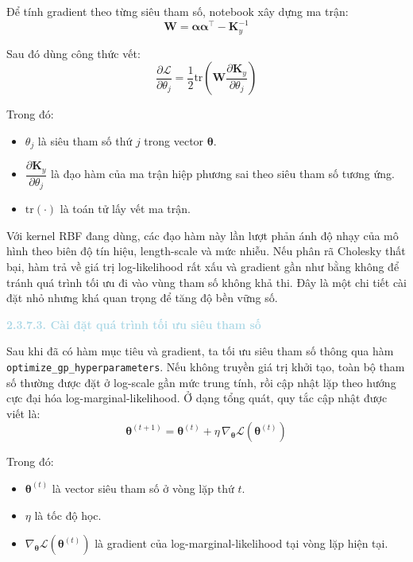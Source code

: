 Để tính gradient theo từng siêu tham số, notebook xây dựng ma trận:
\begin{equation}
    \mathbf{W} = \boldsymbol{\alpha}\boldsymbol{\alpha}^{\top} - \mathbf{K}_y^{-1}
\end{equation}

Sau đó dùng công thức vết:
\begin{equation}
    \frac{\partial \mathcal{L}}{\partial \theta_j} = \frac{1}{2}\mathrm{tr}\!\left(\mathbf{W}\frac{\partial \mathbf{K}_y}{\partial \theta_j}\right)
\end{equation}

Trong đó:
\begin{itemize}
    \item $\theta_j$ là siêu tham số thứ $j$ trong vector $\boldsymbol{\theta}$.
    \item $\dfrac{\partial \mathbf{K}_y}{\partial \theta_j}$ là đạo hàm của ma trận hiệp phương sai theo siêu tham số tương ứng.
    \item $\mathrm{tr}(\cdot)$ là toán tử lấy vết ma trận.
\end{itemize}

Với kernel RBF đang dùng, các đạo hàm này lần lượt phản ánh độ nhạy của mô hình theo biên độ tín hiệu, length-scale và mức nhiễu. Nếu phân rã Cholesky thất bại, hàm trả về giá trị log-likelihood rất xấu và gradient gần như bằng không để tránh quá trình tối ưu đi vào vùng tham số không khả thi. Đây là một chi tiết cài đặt nhỏ nhưng khá quan trọng để tăng độ bền vững số.

\noindent\textcolor{lightblue}{\textbf{2.3.7.3. Cài đặt quá trình tối ưu siêu tham số}}

Sau khi đã có hàm mục tiêu và gradient, ta tối ưu siêu tham số thông qua hàm \texttt{optimize\_gp\_hyperparameters}. Nếu không truyền giá trị khởi tạo, toàn bộ tham số thường được đặt ở log-scale gần mức trung tính, rồi cập nhật lặp theo hướng cực đại hóa log-marginal-likelihood. Ở dạng tổng quát, quy tắc cập nhật được viết là:
\begin{equation}
    \boldsymbol{\theta}^{(t+1)} = \boldsymbol{\theta}^{(t)} + \eta\, \nabla_{\boldsymbol{\theta}} \mathcal{L}(\boldsymbol{\theta}^{(t)})
\end{equation}

Trong đó:
\begin{itemize}
    \item $\boldsymbol{\theta}^{(t)}$ là vector siêu tham số ở vòng lặp thứ $t$.
    \item $\eta$ là tốc độ học.
    \item $\nabla_{\boldsymbol{\theta}} \mathcal{L}(\boldsymbol{\theta}^{(t)})$ là gradient của log-marginal-likelihood tại vòng lặp hiện tại.
\end{itemize}

